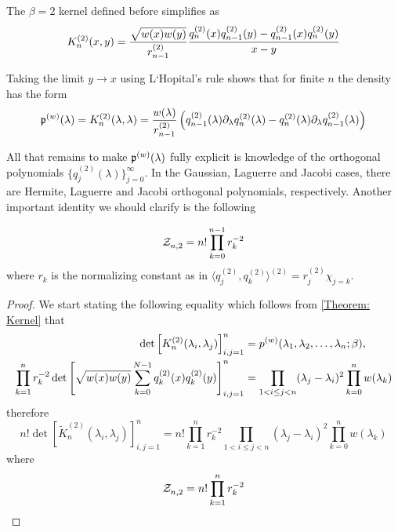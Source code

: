 \begin{prop}
	The $\beta=2$ kernel defined before simplifies as
	\begin{equation}
		K_n^{(2)}(x,y) = \frac{\sqrt{w(x) w(y)}}{r_{n-1}^{(2)}} \frac{q_n^{(2)}(x)q_{n-1}^{(2)}(y) - q_{n-1}^{(2)}(x)q_n^{(2)}(y)}{x-y}
	\end{equation}
	\label{Proposition: Kernel Simplification beta 2}
\end{prop}
Taking the limit $y \rightarrow x$ using L`Hopital's rule shows that for finite $n$ the density has the form
\begin{equation}
	\mathfrak{p}^{(w)}(\lambda) = K_n^{(2)}(\lambda, \lambda) = \frac{w(\lambda)}{r_{n-1}^{(2)}} \left( q_{n-1}^{(2)}(\lambda)\partial_\lambda q_{n}^{(2)}(\lambda) - q_{n}^{(2)}(\lambda)\partial_\lambda q_{n-1}^{(2)}(\lambda)  \right)
	\label{Equation: Equilibrium Measure and Kernel}
\end{equation}

All that remains to make $\mathfrak{p}^{(w)}(\lambda)$ fully explicit is knowledge of the orthogonal polynomials $\{q_j^{(2)}(\lambda)\}_{j=0}^\infty$. In the Gaussian, Laguerre and Jacobi cases, there are Hermite, Laguerre and Jacobi orthogonal polynomials, respectively. Another important identity we should clarify is the following

\begin{prop}
	\begin{equation}
		\mathcal{Z}_{n,2}^{} = n! \prod_{k=0}^{n-1} r_k^{-2}
	\end{equation}
	where $r_k$ is the normalizing constant as in $\langle q_j^{(2)}, q_k^{(2)} \rangle^{(2)} = r_j^{(2)} \chi_{j=k}$.
	\label{Proposition: Partition function}
\end{prop}
\begin{proof}
	We start stating the following equality which follows from \ref{Theorem: Kernel} that
	\begin{align}
			\det\left[ K_n^{(2)}(\lambda_i, \lambda_j) \right]_{i,j=1}^{n} & =  p^{(w)}(\lambda_1, \lambda_2, \dots, \lambda_n;\beta), \\
			\prod_{k=1}^n r_k^{-2}  \det\left[ \sqrt{w(x) w(y)} \sum_{k=0}^{N-1} q_k^{(2)}(x) q_k^{(2)}(y) \right]_{i,j=1}^{n} & = \prod_{1 < i \leq j < n} (\lambda_j - \lambda_i)^2 \prod_{k=0}^{n} w(\lambda_k)
	\end{align}
	therefore
	\begin{equation}
		n! \det\left[ \tilde{K}_n^{(2)}(\lambda_i, \lambda_j) \right]_{i,j=1}^{n} = n! \prod_{k=1}^n r_k^{-2} \prod_{1 < i \leq j < n} (\lambda_j - \lambda_i)^2 \prod_{k=0}^{n} w(\lambda_k)
	\end{equation}
	where
	\begin{equation}
		\mathcal{Z}_{n,2}^{} = n! \prod_{k=1}^n r_k^{-2}
	\end{equation}
\end{proof}
